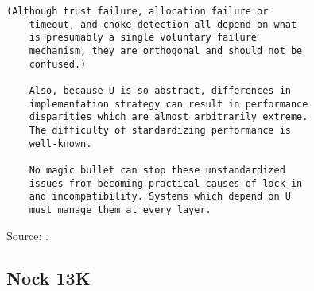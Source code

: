 \documentclass[twoside]{article}
\begin{document}
\begin{lstlisting}[label=lst:u,caption={\texttt{U}, 31 January 2006.  The earliest extant patriarch of the Nock family.},style=listingcode]
    (Although trust failure, allocation failure or
    timeout, and choke detection all depend on what
    is presumably a single voluntary failure
    mechanism, they are orthogonal and should not be
    confused.)

    Also, because U is so abstract, differences in
    implementation strategy can result in performance
    disparities which are almost arbitrarily extreme.
    The difficulty of standardizing performance is
    well-known.

    No magic bullet can stop these unstandardized
    issues from becoming practical causes of lock-in
    and incompatibility. Systems which depend on U
    must manage them at every layer.
\end{lstlisting}



Source:  \citet{Yarvin2006}.

\subsection{Nock 13K}
\end{document}
